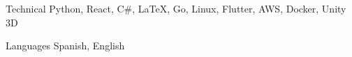 
\begin{cvskills}

  \cvskill
    {Technical} %
    {Python, React, C\#, LaTeX, Go, Linux, Flutter, AWS, Docker, Unity 3D} %





  \cvskill
    {Languages} %
    {Spanish, English} %

\end{cvskills}
